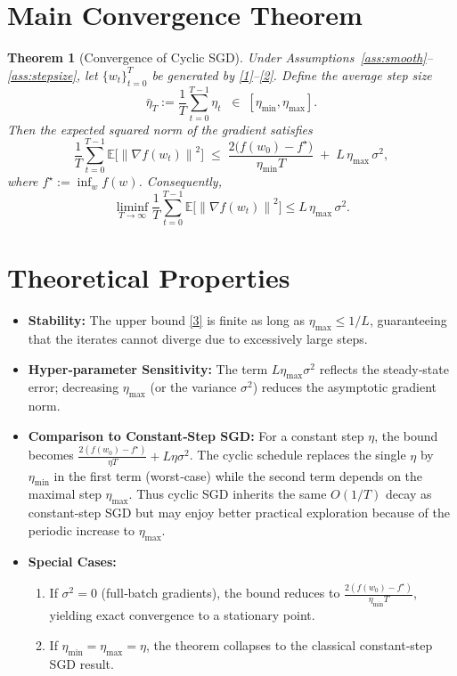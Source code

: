 \documentclass{article}
\newcommand{\E}{\mathbb{E}}
\newcommand{\norm}[1]{\left\| #1 \right\|}
\newtheorem{theorem}{Theorem}
\begin{document}
\section*{Main Convergence Theorem}
\begin{theorem}[Convergence of Cyclic SGD]\label{thm:main}
Under Assumptions~\ref{ass:smooth}–\ref{ass:stepsize}, let $\{w_t\}_{t=0}^{T}$ be generated by \eqref{1}–\eqref{2}. Define the average step size
\[
\bar\eta_T:=\frac1T\sum_{t=0}^{T-1}\eta_t\;\;\in\;[\eta_{\min},\eta_{\max}].
\]
Then the expected squared norm of the gradient satisfies
\begin{equation}
\frac1T\sum_{t=0}^{T-1}\E\!\big[\norm{\nabla f(w_t)}^2\big]
\;\le\;
\frac{2\big(f(w_0)-f^{\star}\big)}{\eta_{\min}T}
\;+\;
L\,\eta_{\max}\,\sigma^2,
\tag{3}
\end{equation}
where $f^{\star}:=\inf_{w}f(w)$. Consequently,
\[
\liminf_{T\to\infty}\frac1T\sum_{t=0}^{T-1}\E\!\big[\norm{\nabla f(w_t)}^2\big]\le L\,\eta_{\max}\,\sigma^2 .
\]
\end{theorem}

\section*{Theoretical Properties}
\begin{itemize}
\item \textbf{Stability:} The upper bound \eqref{3} is finite as long as $\eta_{\max}\le 1/L$, guaranteeing that the iterates cannot diverge due to excessively large steps.
\item \textbf{Hyper‑parameter Sensitivity:} The term $L\eta_{\max}\sigma^2$ reflects the steady‑state error; decreasing $\eta_{\max}$ (or the variance $\sigma^2$) reduces the asymptotic gradient norm.
\item \textbf{Comparison to Constant‑Step SGD:} For a constant step $\eta$, the bound becomes $\frac{2(f(w_0)-f^{\star})}{\eta T}+L\eta\sigma^2$. The cyclic schedule replaces the single $\eta$ by $\eta_{\min}$ in the first term (worst‑case) while the second term depends on the maximal step $\eta_{\max}$. Thus cyclic SGD inherits the same $O(1/T)$ decay as constant‑step SGD but may enjoy better practical exploration because of the periodic increase to $\eta_{\max}$.
\item \textbf{Special Cases:}
    \begin{enumerate}
        \item If $\sigma^2=0$ (full‑batch gradients), the bound reduces to $\frac{2(f(w_0)-f^{\star})}{\eta_{\min}T}$, yielding exact convergence to a stationary point.
        \item If $\eta_{\min}=\eta_{\max}=\eta$, the theorem collapses to the classical constant‑step SGD result.
    \end{enumerate}
\end{itemize}
\end{document}
